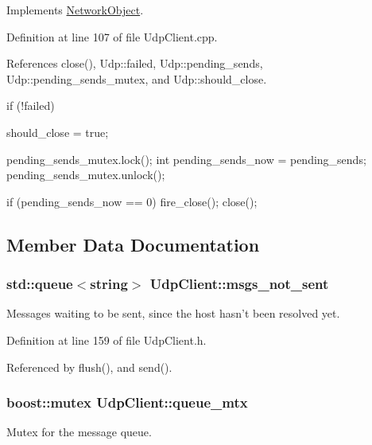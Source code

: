 Implements \hyperlink{classNetworkObject_a2f519457fd87c8a92cf265a2b2883e96}{NetworkObject}.



Definition at line 107 of file UdpClient.cpp.



References close(), Udp::failed, Udp::pending\_\-sends, Udp::pending\_\-sends\_\-mutex, and Udp::should\_\-close.


\begin{DoxyCode}
{
    if (!failed)
    {
        should_close = true;

        pending_sends_mutex.lock();
        int pending_sends_now = pending_sends;
        pending_sends_mutex.unlock();

        if (pending_sends_now == 0)
        {
            fire_close();
            close();
        }
    }
}
\end{DoxyCode}


\subsection{Member Data Documentation}
\hypertarget{classUdpClient_a8843ba58204e08e3250b483d459b3416}{
\subsubsection[{msgs\_\-not\_\-sent}]{\setlength{\rightskip}{0pt plus 5cm}std::queue$<$string$>$ {\bf UdpClient::msgs\_\-not\_\-sent}}}
\label{classUdpClient_a8843ba58204e08e3250b483d459b3416}
Messages waiting to be sent, since the host hasn't been resolved yet. 

Definition at line 159 of file UdpClient.h.



Referenced by flush(), and send().

\hypertarget{classUdpClient_aa978126795bc551151f6442ba8421fc9}{
\subsubsection[{queue\_\-mtx}]{\setlength{\rightskip}{0pt plus 5cm}boost::mutex {\bf UdpClient::queue\_\-mtx}}}
\label{classUdpClient_aa978126795bc551151f6442ba8421fc9}
Mutex for the message queue. 

